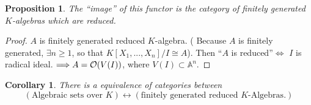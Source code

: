 \documentclass[11pt]{article}
\newtheorem{prop}[thm]{Proposition}
\newtheorem{cor}[thm]{Corollary}
\newcommand{\affn}{\mathbb A}
\newcommand{\calo}{{\cal O}}
\newcommand{\Lrta}{\Longrightarrow}
\newcommand{\llrta}{\longleftrightarrow}
\newcommand{\Llrta}{\Longleftrightarrow}
\begin{document}
\begin{prop} The ``image'' of this functor is the category of finitely generated $K$-algebras which are reduced.
\end{prop}
\begin{proof}
$A$ is  finitely generated reduced $K$-algebra. ( Because $A$ is finitely generated, $\exists n\geq 1$, so that $K[X_1,...,X_n]/I\cong A$). Then ``$A$ is reduced''$\Llrta$ $I$ is radical ideal.
$\Lrta A=\calo(V(I))$, where $V(I)\subset \affn^n$.
\end{proof}

\begin{cor}
There is a equivalence of categories between 
$$
(\text{Algebraic sets over $K$})\llrta (\text{finitely generated reduced } K\text{-Algebras}.)
$$
\end{cor}
\end{document}
